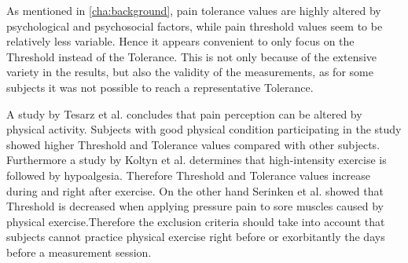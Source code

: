 As mentioned in \autoref{cha:background}, pain tolerance values are highly altered by psychological and psychosocial factors, while pain threshold values seem to be relatively less variable. Hence  it appears convenient to only focus on the Threshold instead of the Tolerance.  This is not only because of the extensive variety in the results, but also the validity of the measurements, as for some subjects it was not possible to reach a representative Tolerance. 

A study by Tesarz et al. \cite{Tesarz2012} concludes that pain perception can be altered by physical activity. Subjects with good physical condition participating in the study showed higher Threshold and Tolerance values compared with other subjects.
Furthermore a study by Koltyn et al. \cite{Koltyn2002} determines that high-intensity exercise is followed by hypoalgesia. Therefore Threshold and Tolerance values increase during and right after exercise. On the other hand Serinken et al. \cite{Serinken2013} showed that Threshold is decreased when applying pressure pain to sore muscles caused by physical exercise.Therefore the exclusion criteria should take into account that subjects cannot practice physical exercise right before or exorbitantly the days before a measurement session.


